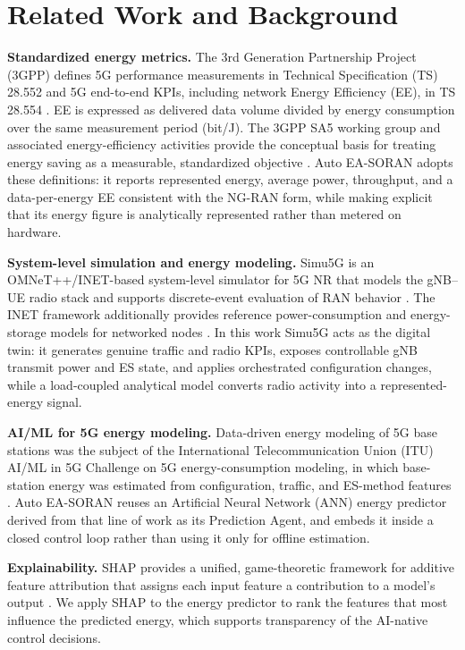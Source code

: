 \documentclass[conference]{IEEEtran}
\begin{document}
\section{Related Work and Background}
\textbf{Standardized energy metrics.} The 3rd Generation Partnership Project (3GPP) defines 5G performance measurements in Technical Specification (TS) 28.552 and 5G end-to-end KPIs, including network Energy Efficiency (EE), in TS 28.554 \cite{b_28554,b_28552}. EE is expressed as delivered data volume divided by energy consumption over the same measurement period (bit/J). The 3GPP SA5 working group and associated energy-efficiency activities provide the conceptual basis for treating energy saving as a measurable, standardized objective \cite{b_3gpp_ee}. Auto EA-SORAN adopts these definitions: it reports represented energy, average power, throughput, and a data-per-energy EE consistent with the NG-RAN form, while making explicit that its energy figure is analytically represented rather than metered on hardware.

\textbf{System-level simulation and energy modeling.} Simu5G is an OMNeT++/INET-based system-level simulator for 5G NR that models the gNB--UE radio stack and supports discrete-event evaluation of RAN behavior \cite{b_simu5g}. The INET framework additionally provides reference power-consumption and energy-storage models for networked nodes \cite{b_inet}. In this work Simu5G acts as the digital twin: it generates genuine traffic and radio KPIs, exposes controllable gNB transmit power and ES state, and applies orchestrated configuration changes, while a load-coupled analytical model converts radio activity into a represented-energy signal.

\textbf{AI/ML for 5G energy modeling.} Data-driven energy modeling of 5G base stations was the subject of the International Telecommunication Union (ITU) AI/ML in 5G Challenge on 5G energy-consumption modeling, in which base-station energy was estimated from configuration, traffic, and ES-method features \cite{b_itu}. Auto EA-SORAN reuses an Artificial Neural Network (ANN) energy predictor derived from that line of work as its Prediction Agent, and embeds it inside a closed control loop rather than using it only for offline estimation.

\textbf{Explainability.} SHAP provides a unified, game-theoretic framework for additive feature attribution that assigns each input feature a contribution to a model's output \cite{b_shap}. We apply SHAP to the energy predictor to rank the features that most influence the predicted energy, which supports transparency of the AI-native control decisions.
\end{document}

